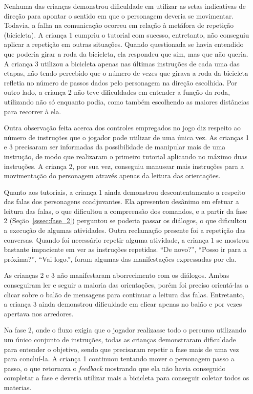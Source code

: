 Nenhuma das crianças demonstrou dificuldade em utilizar as setas indicativas de direção para apontar o sentido em que o personagem deveria se movimentar. Todavia, a falha na comunicação ocorreu em relação à metáfora de repetição (bicicleta). A criança 1 cumpriu o tutorial com sucesso, entretanto, não conseguiu aplicar a repetição em outras situações. Quando questionada se havia entendido que poderia girar a roda da bicicleta, ela respondeu que sim, mas que não queria. A criança 3 utilizou a bicicleta apenas nas últimas instruções de cada uma das etapas, não tendo percebido que o número de vezes que girava a roda da bicicleta refletia no número de passos dados pelo personagem na direção escolhida. Por outro lado, a criança 2 não teve dificuldades em entender a função da roda, utilizando não só enquanto podia, como também escolhendo as maiores distâncias para recorrer à ela.

Outra observação feita acerca dos controles empregados no jogo diz respeito ao número de instruções que o jogador pode utilizar de uma única vez. As crianças 1 e 3 precisaram ser informadas da possibilidade de manipular mais de uma instrução, de modo que realizaram o primeiro tutorial aplicando no máximo duas instruções. A criança 2, por sua vez, conseguiu manusear mais instruções para a movimentação do personagem através apenas da leitura das orientações.

Quanto aos tutoriais, a criança 1 ainda demonstrou descontentamento a respeito das falas dos personagens coadjuvantes. Ela apresentou desânimo em efetuar a leitura das falas, o que dificultou a compreensão dos comandos, e a partir da fase 2 (Seção~\ref{sssec:fase_2}) perguntou se poderia passar os diálogos, o que dificultou a execução de algumas atividades. Outra reclamação presente foi a repetição das conversas. Quando foi necessário repetir alguma atividade, a criança 1 se mostrou bastante impaciente em ver as instruções repetidas. “De novo?”, “Posso ir para a próxima?”, “Vai logo.”, foram algumas das manifestações expressadas por ela.

As crianças 2 e 3 não manifestaram aborrecimento com os diálogos. Ambas conseguiram ler e seguir a maioria das orientações, porém foi preciso orientá-las a clicar sobre o balão de mensagens para continuar a leitura das falas. Entretanto, a criança 3 ainda demonstrou dificuldade em clicar apenas no balão e por vezes apertava nos arredores.

Na fase 2, onde o fluxo exigia que o jogador realizasse todo o percurso utilizando um único conjunto de instruções, todas as crianças demonstraram dificuldade para entender o objetivo, sendo que precisaram repetir a fase mais de uma vez para concluí-la. A criança 1 continuou tentando mover o personagem passo a passo, o que retornava o \textit{feedback} mostrando que ela não havia conseguido completar a fase e deveria utilizar mais a bicicleta para conseguir coletar todos os materias.

